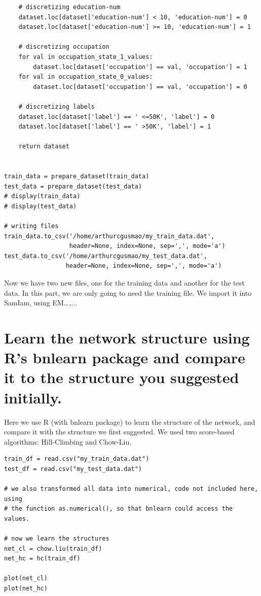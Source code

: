 \documentclass{article}
\begin{document}
\begin{verbatim}
    # discretizing education-num
    dataset.loc[dataset['education-num'] < 10, 'education-num'] = 0
    dataset.loc[dataset['education-num'] >= 10, 'education-num'] = 1

    # discretizing occupation
    for val in occupation_state_1_values:
        dataset.loc[dataset['occupation'] == val, 'occupation'] = 1
    for val in occupation_state_0_values:
        dataset.loc[dataset['occupation'] == val, 'occupation'] = 0

    # discretizing labels
    dataset.loc[dataset['label'] == ' <=50K', 'label'] = 0
    dataset.loc[dataset['label'] == ' >50K', 'label'] = 1

    return dataset


train_data = prepare_dataset(train_data)
test_data = prepare_dataset(test_data)
# display(train_data)
# display(test_data)

# writing files
train_data.to_csv('/home/arthurcgusmao/my_train_data.dat',
                  header=None, index=None, sep=',', mode='a')
test_data.to_csv('/home/arthurcgusmao/my_test_data.dat',
                 header=None, index=None, sep=',', mode='a')
\end{verbatim}


Now we have two new files, one for the training data and another for the test data.  In this
part, we are only going to need the training file. We import it into SamIam, using EM\ldots{}\ldots{}..


\section{Learn the network structure using R's bnlearn package and compare it to the structure you suggested initially.}
\label{sec-2}
Here we use R (with bnlearn package) to learn the structure of the network, and compare it with
the structure we first suggested. We used two score-based algorithms: Hill-Climbing and
Chow-Liu.

\begin{verbatim}
train_df = read.csv("my_train_data.dat")
test_df = read.csv("my_test_data.dat")

# we also transformed all data into numerical, code not included here, using
# the function as.numerical(), so that bnlearn could access the values.

# now we learn the structures
net_cl = chow.liu(train_df)
net_hc = hc(train_df)

plot(net_cl)
plot(net_hc)
\end{verbatim}
\end{document}
